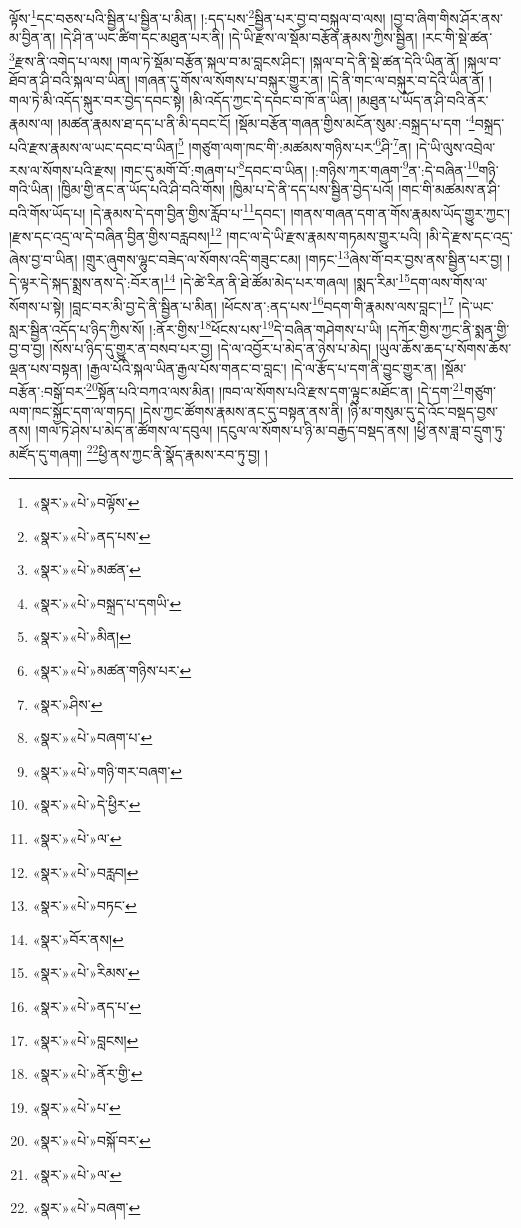 ལྟོས་\footnote{«སྣར་»«པེ་»བལྟོས་}དང་བཅས་པའི་སྦྱིན་པ་སྦྱིན་པ་མིན། །:དད་པས་\footnote{«སྣར་»«པེ་»ནད་པས་}སྦྱིན་པར་བྱ་བ་བསྐུལ་བ་ལས། །བྱ་བ་ཞིག་གིས་ཤོར་ནས་མ་བྱིན་ན། །དེ་ཤི་ན་ཡང་ཚིག་དང་མཐུན་པར་ནི། །དེ་ཡི་རྫས་ལ་སྡོམ་བརྩོན་རྣམས་ཀྱིས་སྦྱིན། །རང་གི་སྡེ་ཚན་\footnote{«སྣར་»«པེ་»མཚན་}རྫས་ནི་འགེད་པ་ལས། །གལ་ཏེ་སྡོམ་བརྩོན་སྐལ་བ་མ་བླངས་ཤིང་། །སྐལ་བ་དེ་ནི་སྡེ་ཚན་དེའི་ཡིན་ནོ། །སྐལ་བ་ཐོབ་ན་ཤི་བའི་སྐལ་བ་ཡིན། །གཞན་དུ་གོས་ལ་སོགས་པ་བསྐུར་གྱུར་ན། །དེ་ནི་གང་ལ་བསྐུར་བ་དེའི་ཡིན་ནོ། །གལ་ཏེ་མི་འདོད་སྐུར་བར་བྱེད་དབང་སྟེ། །མི་འདོད་ཀྱང་དེ་དབང་བ་ཁོ་ན་ཡིན། །མཐུན་པ་ཡོད་ན་ཤི་བའི་ནོར་རྣམས་ལ། །མཚན་རྣམས་ཐ་དད་པ་ནི་མི་དབང་ངོ། །སྡོམ་བརྩོན་གཞན་གྱིས་མངོན་སུམ་:བསྐྲད་པ་དག ་\footnote{«སྣར་»«པེ་»བསྐྲད་པ་དགཡི་}བསྐྲད་པའི་རྫས་རྣམས་ལ་ཡང་དབང་བ་ཡིན།\footnote{«སྣར་»«པེ་»མིན།} །གཙུག་ལག་ཁང་གི་:མཚམས་གཉིས་པར་\footnote{«སྣར་»«པེ་»མཚན་གཉིས་པར་}ཤི་\footnote{«སྣར་»ཤིས་}ན། །དེ་ཡི་ལུས་འབྲེལ་རས་ལ་སོགས་པའི་རྫས། །གང་དུ་མགོ་བོ་:གཞག་པ་\footnote{«སྣར་»«པེ་»བཞག་པ་}དབང་བ་ཡིན། །:གཉིས་ཀར་གཞག་\footnote{«སྣར་»«པེ་»གཉི་གར་བཞག་}ན་:དེ་བཞིན་\footnote{«སྣར་»«པེ་»དེ་ཕྱིར་}གཉི་གའི་ཡིན། །ཁྱིམ་གྱི་ནང་ན་ཡོད་པའི་ཤི་བའི་གོས། །ཁྱིམ་པ་དེ་ནི་དད་པས་སྦྱིན་བྱེད་པའོ། །གང་གི་མཚམས་ན་ཤི་བའི་གོས་ཡོད་པ། །དེ་རྣམས་དེ་དག་བྱིན་གྱིས་རློབ་པ་\footnote{«སྣར་»«པེ་»ལ་}དབང་། །གནས་གཞན་དག་ན་གོས་རྣམས་ཡོད་གྱུར་ཀྱང་། །རྫས་དང་འདྲ་ལ་དེ་བཞིན་བྱིན་གྱིས་བརླབས།\footnote{«སྣར་»«པེ་»བརླབ།} །གང་ལ་དེ་ཡི་རྫས་རྣམས་གཏམས་གྱུར་པའི། །མི་དེ་རྫས་དང་འདྲ་ཞེས་བྱ་བ་ཡིན། །གྲུར་ཞུགས་ལྷུང་བཟེད་ལ་སོགས་འདི་གཟུང་ངམ། །གཏང་\footnote{«སྣར་»«པེ་»བཏང་}ཞེས་གོ་བར་བྱས་ནས་སྦྱིན་པར་བྱ། །དེ་ལྟར་དེ་སྐད་སྨྲས་ནས་དེ་:བོར་ན།\footnote{«སྣར་»བོར་ནས།} །དེ་ཚེ་རིན་ནི་ཐེ་ཚོམ་མེད་པར་གཞལ། །སྨད་རིམ་\footnote{«སྣར་»«པེ་»རིམས་}དག་ལས་གོས་ལ་སོགས་པ་སྟེ། །བླང་བར་མི་བྱ་དེ་ནི་སྦྱིན་པ་མིན། །ཕོངས་ན་:ནད་པས་\footnote{«སྣར་»«པེ་»ནད་པ་}བདག་གི་རྣམས་ལས་བླང་།\footnote{«སྣར་»«པེ་»བླངས།} །དེ་ཡང་སླར་སྦྱིན་འདོད་པ་ཉིད་ཀྱིས་སོ། །:ནོར་གྱིས་\footnote{«སྣར་»«པེ་»ནོར་གྱི་}ཕོངས་པས་\footnote{«སྣར་»«པེ་»པ་}དེ་བཞིན་གཤེགས་པ་ཡི། །དཀོར་གྱིས་ཀྱང་ནི་སྨན་གྱི་བྱ་བ་བྱ། །སོས་པ་ཉིད་དུ་གྱུར་ན་བསབ་པར་བྱ། །དེ་ལ་འབྱོར་པ་མེད་ན་ཉེས་པ་མེད། །ཡུལ་ཆོས་ཆད་པ་སོགས་ཆོས་ལྡན་པས་བསྟན། །རྒྱལ་པོའི་སྐལ་ཡིན་རྒྱལ་པོས་གནང་བ་བླང་། །དེ་ལ་རྩོད་པ་དག་ནི་བྱུང་གྱུར་ན། །སྡོམ་བརྩོན་:བསྒོ་བར་\footnote{«སྣར་»«པེ་»བསྐོ་བར་}སྟོན་པའི་བཀའ་ལས་མིན། །ཁབ་ལ་སོགས་པའི་རྫས་དག་ལྟུང་མཐོང་ན། །དེ་དག་\footnote{«སྣར་»«པེ་»ལ་}གཙུག་ལག་ཁང་སྐྱོང་དག་ལ་གཏད། །དེས་ཀྱང་ཚོགས་རྣམས་ནང་དུ་བསྟན་ནས་ནི། །ཉི་མ་གསུམ་དུ་དེ་འོང་བསྡད་བྱས་ནས། །གལ་ཏེ་ཤེས་པ་མེད་ན་ཚོགས་ལ་དབུལ། །དངུལ་ལ་སོགས་པ་ཉི་མ་བརྒྱད་བསྡད་ནས། །ཕྱི་ནས་ཟླ་བ་དྲུག་ཏུ་མཛོད་དུ་གཞག། \footnote{«སྣར་»«པེ་»བཞག་}ཕྱི་ནས་ཀྱང་ནི་སྣོད་རྣམས་རབ་ཏུ་བྱ། །
